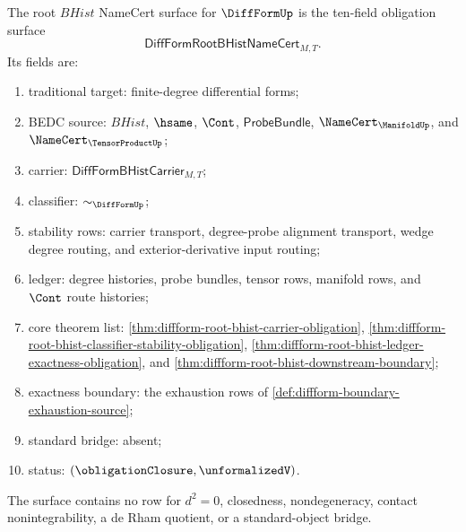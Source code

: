 \begin{definition}
\label{def:diffform-root-bhist-namecert-surface}
The root $BHist$ NameCert surface for $\DiffFormUp$ is the ten-field
obligation surface
$$
\mathsf{DiffFormRootBHistNameCert}_{M,T}.
$$
Its fields are:
\begin{enumerate}
  \item traditional target: finite-degree differential forms;
  \item BEDC source: $BHist$, $\hsame$, $\Cont$, $\mathsf{ProbeBundle}$,
  $\NameCert_{\ManifoldUp}$, and $\NameCert_{\TensorProductUp}$;
  \item carrier: $\mathsf{DiffFormBHistCarrier}_{M,T}$;
  \item classifier: $\sim_{\DiffFormUp}$;
  \item stability rows: carrier transport, degree-probe alignment transport,
  wedge degree routing, and exterior-derivative input routing;
  \item ledger: degree histories, probe bundles, tensor rows, manifold rows,
  and $\Cont$ route histories;
  \item core theorem list:
  \autoref{thm:diffform-root-bhist-carrier-obligation},
  \autoref{thm:diffform-root-bhist-classifier-stability-obligation},
  \autoref{thm:diffform-root-bhist-ledger-exactness-obligation}, and
  \autoref{thm:diffform-root-bhist-downstream-boundary};
  \item exactness boundary: the exhaustion rows of
  \autoref{def:diffform-boundary-exhaustion-source};
  \item standard bridge: absent;
  \item status: $(\obligationClosure,\unformalizedV)$.
\end{enumerate}
The surface contains no row for $d^2=0$, closedness, nondegeneracy, contact
nonintegrability, a de Rham quotient, or a standard-object bridge.
\end{definition}

